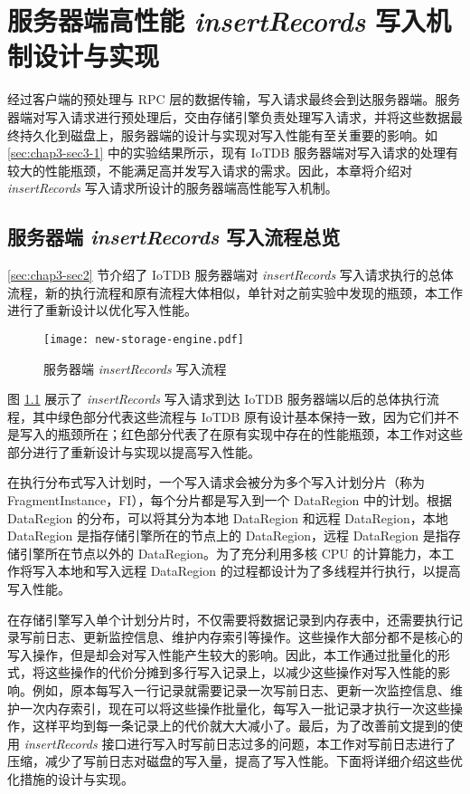 
\chapter{服务器端高性能 \emph{insertRecords} 写入机制设计与实现}
经过客户端的预处理与 RPC 层的数据传输，写入请求最终会到达服务器端。服务器端对写入请求进行预处理后，交由存储引擎负责处理写入请求，并将这些数据最终持久化到磁盘上，服务器端的设计与实现对写入性能有至关重要的影响。如 \ref{sec:chap3-sec3-1} 中的实验结果所示，现有 IoTDB 服务器端对写入请求的处理有较大的性能瓶颈，不能满足高并发写入请求的需求。因此，本章将介绍对 \emph{insertRecords} 写入请求所设计的服务器端高性能写入机制。


\section{服务器端 \emph{insertRecords} 写入流程总览}
\ref{sec:chap3-sec2} 节介绍了 IoTDB 服务器端对 \emph{insertRecords} 写入请求执行的总体流程，新的执行流程和原有流程大体相似，单针对之前实验中发现的瓶颈，本工作进行了重新设计以优化写入性能。

\begin{figure}
  \centering
  \texttt{[image: new-storage-engine.pdf]}
  \caption{服务器端 \emph{insertRecords} 写入流程}
  \label{fig:iotdb-insertRecords-flow}
\end{figure}

图 \ref{fig:iotdb-insertRecords-flow} 展示了 \emph{insertRecords} 写入请求到达 IoTDB 服务器端以后的总体执行流程，其中绿色部分代表这些流程与 IoTDB 原有设计基本保持一致，因为它们并不是写入的瓶颈所在；红色部分代表了在原有实现中存在的性能瓶颈，本工作对这些部分进行了重新设计与实现以提高写入性能。


在执行分布式写入计划时，一个写入请求会被分为多个写入计划分片（称为 FragmentInstance，FI），每个分片都是写入到一个 DataRegion 中的计划。根据 DataRegion 的分布，可以将其分为本地 DataRegion 和远程 DataRegion，本地 DataRegion 是指存储引擎所在的节点上的 DataRegion，远程 DataRegion 是指存储引擎所在节点以外的 DataRegion。为了充分利用多核 CPU 的计算能力，本工作将写入本地和写入远程 DataRegion 的过程都设计为了多线程并行执行，以提高写入性能。

在存储引擎写入单个计划分片时，不仅需要将数据记录到内存表中，还需要执行记录写前日志、更新监控信息、维护内存索引等操作。这些操作大部分都不是核心的写入操作，但是却会对写入性能产生较大的影响。因此，本工作通过批量化的形式，将这些操作的代价分摊到多行写入记录上，以减少这些操作对写入性能的影响。例如，原本每写入一行记录就需要记录一次写前日志、更新一次监控信息、维护一次内存索引，现在可以将这些操作批量化，每写入一批记录才执行一次这些操作，这样平均到每一条记录上的代价就大大减小了。最后，为了改善前文提到的使用 \emph{insertRecords} 接口进行写入时写前日志过多的问题，本工作对写前日志进行了压缩，减少了写前日志对磁盘的写入量，提高了写入性能。下面将详细介绍这些优化措施的设计与实现。

